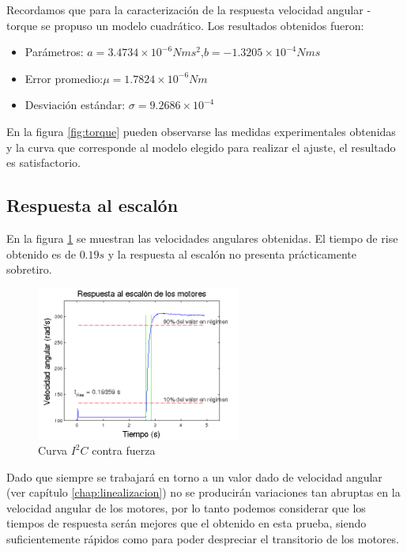 \documentclass[main]{subfiles}
\begin{document}
Recordamos que para la caracterizaci\'on de la respuesta velocidad angular - torque se propuso un modelo cuadr\'atico. Los resultados obtenidos fueron:

\begin{itemize}
\item Par\'ametros: \newline$a=3.4734\times10^{-6}Nms^2$,\newline$b=-1.3205\times 10 ^{-4} Nms$
\item Error promedio:\newline$\mu = 1.7824\times 10^{-6}Nm$
\item Desviaci\'on est\'andar: \newline$\sigma = 9.2686\times 10^{-4}$ 
\end{itemize}

En la figura \ref{fig:torque} pueden observarse las medidas experimentales obtenidas y la curva que corresponde al modelo elegido para realizar el ajuste, el resultado es satisfactorio.

\subsection{Respuesta al escal\'on}

En la figura \ref{fig:resp_esc} se muestran las velocidades angulares obtenidas. El tiempo de rise obtenido es de $0.19s$ y la respuesta al escal\'on no presenta pr\'acticamente sobretiro.

\begin{figure}
\vspace{-25pt}
  \begin{center}
	\includegraphics[width=0.6\textwidth]{./pics_motores/resp_esc.png}
  \caption{Curva $I^2C$ contra fuerza}
  \end{center}
  \label{fig:resp_esc}
\end{figure}

Dado que siempre se trabajar\'a en torno a un valor dado de velocidad angular (ver cap\'itulo \ref{chap:linealizacion}) no se producir\'an variaciones tan abruptas en la velocidad angular de los motores, por lo tanto podemos considerar que los tiempos de respuesta ser\'an mejores que el obtenido en esta prueba, siendo suficientemente r\'apidos como para poder despreciar el transitorio de los motores.
\end{document}

